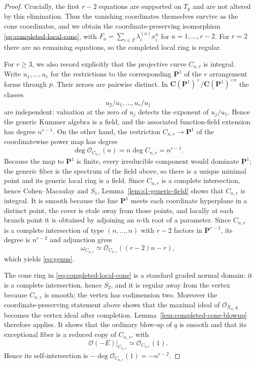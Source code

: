 \documentclass[11pt]{article}
\newcommand{\PP}{\mathbf P}
\newcommand{\CC}{\mathbf C}
\newcommand{\OO}{\mathcal O}
\begin{document}
\begin{proof}
Crucially, the first $r-2$ equations are supported on $T_p$ and are not altered by
this elimination.  Thus the vanishing coordinates themselves survive as the
cone coordinates, and we obtain the coordinate-preserving isomorphism
\eqref{eq:completed-local-cone}, with
$F_a=\sum_{i\in T}\lambda_i^{(a)}x_i^n$ for $a=1,\ldots,r-2$.
For $r=2$ there are no remaining equations, so the completed local ring is
regular.

For $r\ge3$, we also record explicitly that the projective curve $C_{n,r}$ is
integral.  Write $u_1,\ldots,u_r$ for the restrictions to the corresponding
$\PP^1$ of the $r$ arrangement forms through $p$.  Their zeroes are pairwise
distinct.  In $\CC(\PP^1)^\times/\CC(\PP^1)^{\times n}$ the classes
\[
        u_2/u_1,\ldots,u_r/u_1
\]
are independent: valuation at the zero of $u_j$ detects the exponent of
$u_j/u_1$.  Hence the generic Kummer algebra is a field, and the associated
function-field extension has degree $n^{r-1}$.  On the other hand, the restriction
$C_{n,r}\to\PP^1$ of the coordinatewise power map has degree
\[
        \deg\OO_{C_{n,r}}(n)=n\deg C_{n,r}=n^{r-1}.
\]
Because the map to $\PP^1$ is finite, every irreducible component would dominate
$\PP^1$; the generic fiber is the spectrum of the field above, so there is a
unique minimal point and its generic local ring is a field.  Since $C_{n,r}$ is a
complete intersection, hence Cohen--Macaulay and $S_1$,
Lemma~\ref{lem:s1-generic-field} shows that $C_{n,r}$ is integral.  It is smooth because the line $\PP^1$ meets each
coordinate hyperplane in a distinct point, the cover is etale
away from those points, and locally at each branch point it is obtained by
adjoining an $n$-th root of a parameter.  Since $C_{n,r}$ is a complete
intersection of type $(n,\ldots,n)$ with $r-2$ factors in $\PP^{r-1}$, its degree
is $n^{r-2}$ and adjunction gives
\[
 \omega_{C_{n,r}}\simeq
 \OO_{C_{n,r}}((r-2)n-r),
\]
which yields \eqref{eq:genus}.

The cone ring in \eqref{eq:completed-local-cone} is a standard graded normal
domain: it is a complete intersection, hence $S_2$, and it is regular away from
the vertex because $C_{n,r}$ is smooth; the vertex has codimension two.  Moreover
the coordinate-preserving statement above shows
that the maximal ideal of $\OO_{X_n,q}$ becomes the vertex ideal after
completion.  Lemma~\ref{lem:completed-cone-blowup} therefore applies.  It shows
that the ordinary blow-up of $q$ is smooth and that its exceptional fiber is a
reduced copy of $C_{n,r}$, with
\[
        \OO(-E)|_{C_{n,r}}\simeq\OO_{C_{n,r}}(1).
\]
Hence its self-intersection is
$-\deg\OO_{C_{n,r}}(1)=-n^{r-2}$.
\end{proof}
\end{document}
